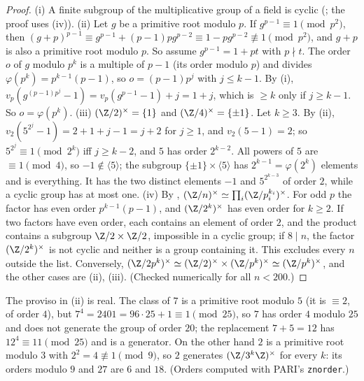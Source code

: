 \begin{proof}
(i) A finite subgroup of the multiplicative group of a field is cyclic (; the proof uses
(iv)).
(ii) Let $g$ be a primitive root modulo $p$. If $g^{p-1}\equiv1\pmod{p^2}$, then
$(g+p)^{p-1}\equiv g^{p-1}+(p-1)pg^{p-2}\equiv1-pg^{p-2}\not\equiv1\pmod{p^2}$, and $g+p$ is also a primitive root modulo $p$. So assume $g^{p-1}=1+pt$
with $p\nmid t$. The order $o$ of $g$ modulo $p^k$ is a multiple of $p-1$ (its order modulo $p$) and divides $\varphi(p^k)=p^{k-1}(p-1)$, so
$o=(p-1)p^j$ with $j\le k-1$. By (i), $v_p(g^{(p-1)p^j}-1)=v_p(g^{p-1}-1)+j=1+j$, which is $\ge k$ only if $j\ge k-1$. So
$o=\varphi(p^k)$.
(iii) $(\Z/2)^\times=\{1\}$ and $(\Z/4)^\times=\{\pm1\}$. Let $k\ge3$. By (ii), $v_2(5^{2^j}-1)=2+1+j-1=j+2$ for $j\ge1$, and $v_2(5-1)=2$;
so $5^{2^j}\equiv1\pmod{2^k}$ iff $j\ge k-2$, and $5$ has order $2^{k-2}$. All powers of $5$ are $\equiv1\pmod4$, so $-1\notin\langle5\rangle$; the subgroup
$\{\pm1\}\times\langle5\rangle$ has $2^{k-1}=\varphi(2^k)$ elements and is everything. It has the two distinct elements $-1$ and $5^{2^{k-3}}$ of order $2$,
while a cyclic group has at most one.
(iv) By , $(\Z/n)^\times\simeq\prod_i(\Z/p_i^{k_i})^\times$. For odd $p$ the factor has even order $p^{k-1}(p-1)$, and $(\Z/2^k)^\times$ has
even order for $k\ge2$. If two factors have even order, each contains an element of order $2$, and the product contains a
subgroup $\Z/2\times\Z/2$, impossible in a cyclic group; if $8\mid n$, the factor $(\Z/2^k)^\times$ is not cyclic and neither is a group
containing it. This excludes every $n$ outside the list. Conversely, $(\Z/2p^k)^\times\simeq(\Z/2)^\times\times(\Z/p^k)^\times\simeq(\Z/p^k)^\times$, and the other cases
are (ii), (iii). (Checked numerically for all $n<200$.)
\end{proof}

The proviso in (ii) is real. The class of $7$ is a primitive root modulo $5$ (it is $\equiv2$, of order $4$), but $7^4=2401=96\cdot25+1\equiv1\pmod{25}$, so $7$ has order $4$
modulo $25$ and does not generate the group of order $20$; the replacement $7+5=12$ has $12^4\equiv11\pmod{25}$ and is a generator. On the other
hand $2$ is a primitive root modulo $3$ with $2^2=4\not\equiv1\pmod9$, so $2$ generates $(\Z/3^k\Z)^\times$ for every $k$: its orders modulo $9$ and $27$ are $6$
and $18$. (Orders computed with PARI's \texttt{znorder}.)


